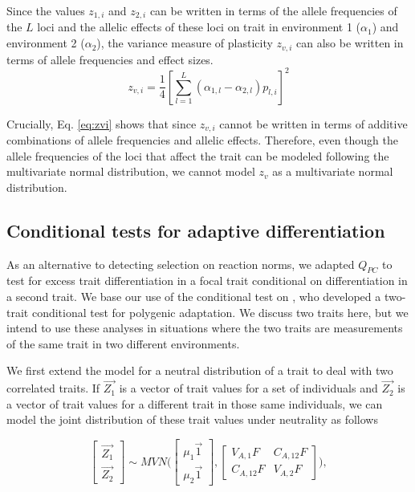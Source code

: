 \documentclass[11pt,letterpaper]{article}
\begin{document}
Since the values $z_{1,i}$ and $z_{2,i}$ can be written in terms of the allele frequencies of the $L$ loci and the allelic effects of these loci on trait in environment 1 ($\alpha_{1}$) and environment 2 ($\alpha_{2}$), the variance measure of plasticity $z_{v,i}$ can also be written in terms of allele frequencies and effect sizes.
\begin{equation}\label{eq:zvi}
z_{v,i} = 
\frac{1}{4}[\sum^{L}_{l=1}(\alpha_{1,l}-\alpha_{2,l})p_{l,i}]^2
  \end{equation}

Crucially, Eq. \ref{eq:zvi} shows that since $z_{v,i}$ cannot be written in terms of additive combinations of allele frequencies and allelic effects.
Therefore, even though the allele frequencies of the loci that affect the trait can be modeled following the multivariate normal distribution, we cannot model $z_{v}$ as a multivariate normal distribution.


\subsection*{Conditional tests for adaptive differentiation}
As an alternative to detecting selection on reaction norms, we adapted $Q_{PC}$ to test for excess trait differentiation in a focal trait conditional on differentiation in a second trait.
We base our use of the conditional test on \cite{Berg2017}, who developed a two-trait conditional test for polygenic adaptation.
We discuss two traits here, but we intend to use these analyses in situations where the two traits are measurements of the same trait in two different environments.

We first extend the model for a neutral distribution of a trait to deal with two correlated traits.
If $\vec{Z_{1}}$ is a vector of trait values for a set of individuals and $\vec{Z_{2}}$ is a vector of trait values for a different trait in those same individuals, we can model the joint distribution of these trait values under neutrality as follows

\begin{equation}\label{eqn:mvn2trait}
  \begin{bmatrix}
\vec{Z_{1}} \\ \vec{Z_{2}}
  \end{bmatrix} \sim MVN\bigg(
  \begin{bmatrix}  \mu_{1}\vec{1}\\ \mu_{2}\vec{1} \end{bmatrix},
   \begin{bmatrix} V_{A,1}F & C_{A,12}F\\ C_{A, 12}F & V_{A,2}F
    \end{bmatrix}\bigg),
\end{equation}
\end{document}
